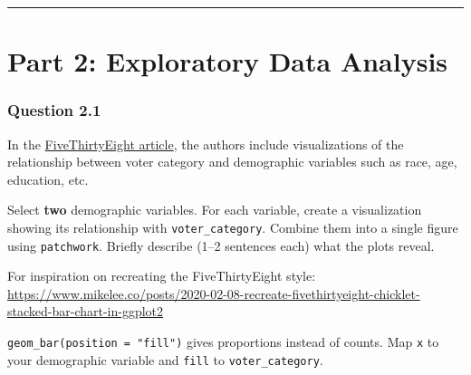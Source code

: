 \documentclass[
  letterpaper,
  DIV=11,
  numbers=noendperiod]{scrartcl}
\begin{document}
\begin{center}\rule{0.5\linewidth}{0.5pt}\end{center}

\section{Part 2: Exploratory Data
Analysis}\label{part-2-exploratory-data-analysis}

\subsubsection*{Question 2.1}\label{question-2.1}

In the
\href{https://projects.fivethirtyeight.com/non-voters-poll-2020-election/}{FiveThirtyEight
article}, the authors include visualizations of the relationship between
voter category and demographic variables such as race, age, education,
etc.

Select \textbf{two} demographic variables. For each variable, create a
visualization showing its relationship with \texttt{voter\_category}.
Combine them into a single figure using \texttt{patchwork}. Briefly
describe (1--2 sentences each) what the plots reveal.

For inspiration on recreating the FiveThirtyEight style:
\url{https://www.mikelee.co/posts/2020-02-08-recreate-fivethirtyeight-chicklet-stacked-bar-chart-in-ggplot2}

\begin{tcolorbox}[enhanced jigsaw, toprule=.15mm, opacitybacktitle=0.6, coltitle=black, opacityback=0, bottomrule=.15mm, left=2mm, colframe=quarto-callout-tip-color-frame, leftrule=.75mm, toptitle=1mm, colbacktitle=quarto-callout-tip-color!10!white, rightrule=.15mm, colback=white, title=\textcolor{quarto-callout-tip-color}{\faLightbulb}\hspace{0.5em}{Hint: Quick proportional bar charts}, arc=.35mm, bottomtitle=1mm, titlerule=0mm, breakable]

\texttt{geom\_bar(position\ =\ "fill")} gives proportions instead of
counts. Map \texttt{x} to your demographic variable and \texttt{fill} to
\texttt{voter\_category}.

\end{tcolorbox}
\end{document}
